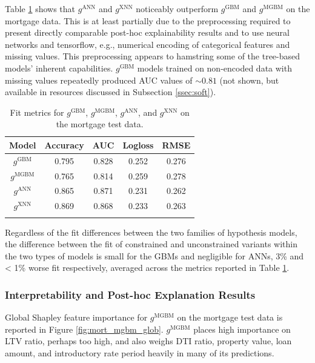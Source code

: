 \documentclass[information,article,submit,moreauthors,pdftex]{definitions/mdpi}
\begin{document}
Table \ref{tab:mort_acc} shows that $g^\text{ANN}$ and $g^\text{XNN}$ noticeably outperform $g^\text{GBM}$ and $g^\text{MGBM}$ on the mortgage data. This is at least partially due to the preprocessing required to present directly comparable post-hoc explainability results and to use neural networks and tensorflow, e.g., numerical encoding of categorical features and missing values. This preprocessing appears to hamstring some of the tree-based models' inherent capabilities. $g^\text{GBM}$ models trained on non-encoded data with missing values repeatedly produced AUC values of $\sim0.81$ (not shown, but available in resources discussed in Subsection \ref{ssec:soft}). 

\begin{table}[H]
\caption{Fit metrics for $g^\text{GBM}$, $g^\text{MGBM}$, $g^\text{ANN}$, and $g^\text{XNN}$ on the mortgage test data.}
\centering
\begin{tabular}{ccccc}
\toprule
\textbf{Model}		& \textbf{Accuracy}	& \textbf{AUC}	 & \textbf{Logloss}	& \textbf{RMSE}\\
\midrule	
$g^\text{GBM}$		& 0.795	& 0.828	& 0.252	& 0.276 \\
$g^\text{MGBM}$		& 0.765	& 0.814	& 0.259	& 0.278 \\
$g^\text{ANN}$		& 0.865	& 0.871	& 0.231	& 0.262 \\
$g^\text{XNN}$		& 0.869	& 0.868	& 0.233	& 0.263 \\
\bottomrule
\label{tab:mort_acc}
\end{tabular}
\end{table}

\noindent Regardless of the fit differences between the two families of hypothesis models, the difference between the fit of constrained and unconstrained variants within the two types of models is small for the GBMs and negligible for ANNs, 3\% and < 1\% worse fit respectively, averaged across the metrics reported in Table \ref{tab:mort_acc}. 

\subsubsection{Interpretability and Post-hoc Explanation Results}

Global Shapley feature importance for $g^\text{MGBM}$ on the mortgage test data is reported in Figure \ref{fig:mort_mgbm_glob}. $g^\text{MGBM}$ places high importance on LTV ratio, perhaps too high, and also weighs DTI ratio, property value, loan amount, and introductory rate period heavily in many of its predictions. 
\end{document}
